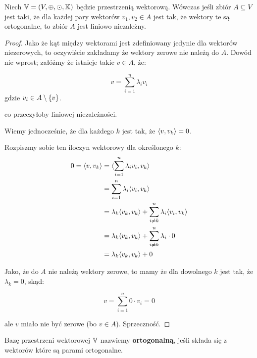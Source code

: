 \begin{theorem}
	Niech \(\mathbb{V} = (V, \oplus, \odot, \mathbb{K})\) będzie przestrzenią wektorową. Wówczas jeśli zbiór \( A \subseteq V\) jest taki, że dla każdej pary wektorów \(v_1, v_2 \in A\) jest tak, że wektory te są ortogonalne, to zbiór \(A\) jest liniowo niezależny.
\end{theorem}
\begin{proof}
	Jako że kąt między wektorami jest zdefiniowany jedynie dla wektorów niezerowych, to oczywiście zakładamy że wektory zerowe nie należą do \(A\).
	Dowód nie wprost; załóżmy że istnieje takie \(v \in A\), że:

	\[
		v = \sum_{i=1}^{n} \lambda_i v_i
	\]
	gdzie \(v_i \in A \setminus \set{v}\).

	co przeczyłoby liniowej niezależności.

	Wiemy jednocześnie, że dla każdego \(k\) jest tak, że \(\langle v, v_k \rangle = 0\).

	Rozpiszmy sobie ten iloczyn wektorowy dla określonego \(k\):
	\begin{align*}
		0 = \langle v, v_k \rangle & = \langle \sum_{i=1}^{n} \lambda_i v_i, v_k \rangle                                      \\
		                    & = \sum_{i=1}^{n} \lambda_i \langle v_i, v_k \rangle                                      \\
		                    & = \lambda_k \langle v_k, v_k \rangle + \sum_{i \not = k}^{n} \lambda_i \langle v_i, v_k \rangle \\
		                    & = \lambda_k \langle v_k, v_k \rangle + \sum_{i \not = k}^{n} \lambda_i \cdot 0           \\
		                    & = \lambda_k \langle v_k, v_k \rangle + 0                                                 \\
	\end{align*}

	Jako, że do \(A\) nie należą wektory zerowe, to mamy że dla dowolnego \(k\) jest tak, że \(\lambda_k = 0\), skąd:

	\[
		v = \sum_{i=1}^{n} 0 \cdot v_i = 0
	\]

	ale \(v\) miało nie być zerowe (bo \(v \in A\)). Sprzeczność.

\end{proof}

\begin{definition}
	Bazę przestrzeni wektorowej \(\mathbb{V}\) nazwiemy \textbf{ortogonalną}, jeśli składa się z wektorów które są parami ortogonalne.
\end{definition}


